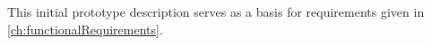


This initial prototype description serves as a basis for requirements given in \autoref{ch:functionalRequirements}.

